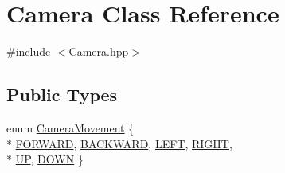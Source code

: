 \hypertarget{classCamera}{}\section{Camera Class Reference}
\label{classCamera}


{\ttfamily \#include $<$Camera.\+hpp$>$}

\subsection*{Public Types}
\begin{DoxyCompactItemize}
\item 
enum \hyperlink{classCamera_a9825f2bf1ddc209c3b2d336080d8407a}{Camera\+Movement} \{ \\*
\hyperlink{classCamera_a9825f2bf1ddc209c3b2d336080d8407aa6388b5408cf8440021383388044ae77f}{F\+O\+R\+W\+A\+RD}, 
\hyperlink{classCamera_a9825f2bf1ddc209c3b2d336080d8407aae18db08a2289896f26dcddf6e2ad274f}{B\+A\+C\+K\+W\+A\+RD}, 
\hyperlink{classCamera_a9825f2bf1ddc209c3b2d336080d8407aa1bed5588ea4c26163a72f0fc8621f6be}{L\+E\+FT}, 
\hyperlink{classCamera_a9825f2bf1ddc209c3b2d336080d8407aaedac3a8506bf2bae7df2d36dd5580884}{R\+I\+G\+HT}, 
\\*
\hyperlink{classCamera_a9825f2bf1ddc209c3b2d336080d8407aaf1360d05d72d9e65285a3b7b2d91524e}{UP}, 
\hyperlink{classCamera_a9825f2bf1ddc209c3b2d336080d8407aa175a5acae39dc7cec69871a517f27de9}{D\+O\+WN}
 \}
\end{DoxyCompactItemize}
